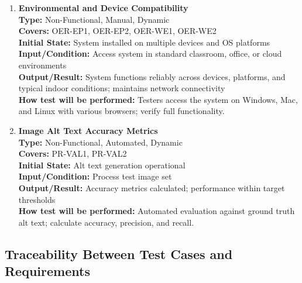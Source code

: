 \documentclass[12pt, titlepage]{article}
\begin{document}
\begin{enumerate}[label=NFR-ST \arabic*., wide=0pt, leftmargin=*]
  \item \textbf{Environmental and Device Compatibility} \\[2mm]
    \textbf{Type:} Non-Functional, Manual, Dynamic \\
    \textbf{Covers:} OER-EP1, OER-EP2, OER-WE1, OER-WE2 \\
    \textbf{Initial State:} System installed on multiple devices and
    OS platforms \\
    \textbf{Input/Condition:} Access system in standard classroom,
    office, or cloud environments \\
    \textbf{Output/Result:} System functions reliably across devices,
    platforms, and typical indoor conditions; maintains network
    connectivity \\[2mm]
    \textbf{How test will be performed:} Testers access the system on
    Windows, Mac, and Linux with various browsers; verify full functionality.


\item \textbf{Image Alt Text Accuracy Metrics} \\[2mm]
  \textbf{Type:} Non-Functional, Automated, Dynamic \\
  \textbf{Covers:} PR-VAL1, PR-VAL2 \\
  \textbf{Initial State:} Alt text generation operational \\
  \textbf{Input/Condition:} Process test image set \\
  \textbf{Output/Result:} Accuracy metrics calculated; performance
  within target thresholds \\[2mm]
  \textbf{How test will be performed:} Automated evaluation against
  ground truth alt text; calculate accuracy, precision, and recall.

\end{enumerate}

\subsection{Traceability Between Test Cases and Requirements}
\end{document}
